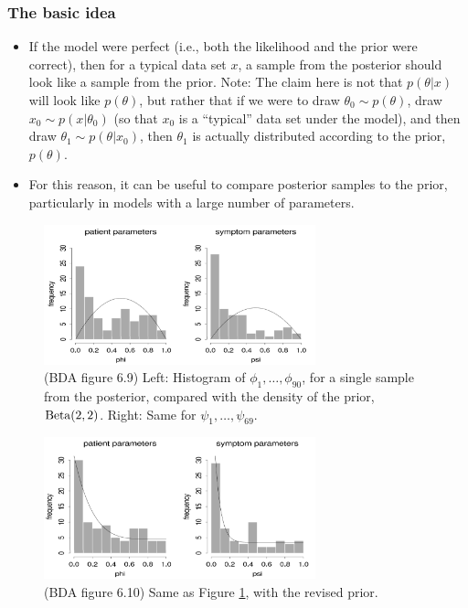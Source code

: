 \documentclass[12pt]{article}
\begin{document}
\subsubsection*{The basic idea}
\begin{itemize}
\item If the model were perfect (i.e., both the likelihood and the prior were correct), then for a typical data set $x$, a sample from the posterior should look like a sample from the prior. Note: The claim here is not that $p(\theta | x)$ will look like $p(\theta)$, but rather that if we were to draw $\theta_0\sim p(\theta)$, draw $x_0\sim p(x|\theta_0)$ (so that $x_0$ is a ``typical'' data set under the model), and then draw $\theta_1\sim p(\theta|x_0)$, then $\theta_1$ is actually distributed according to the prior, $p(\theta)$.
\item For this reason, it can be useful to compare posterior samples to the prior, particularly in models with a large number of parameters.
\end{itemize}

\begin{figure}
\begin{center}
\includegraphics[width=0.7\textwidth]{psychology-1.png}
\end{center}
\caption{(BDA figure 6.9) Left: Histogram of $\phi_1,\ldots,\phi_{90}$, for a single sample from the posterior, compared with the density of the prior, $\operatorname*{Beta}(2,2)$. Right: Same for $\psi_1,\ldots,\psi_{69}$.}
\label{figure:psychology-1}
\end{figure}

\begin{figure}
\begin{center}
\includegraphics[width=0.7\textwidth]{psychology-2.png}
\end{center}
\caption{(BDA figure 6.10) Same as Figure \ref{figure:psychology-1}, with the revised prior.}
\label{figure:psychology-2}
\end{figure}
\end{document}
